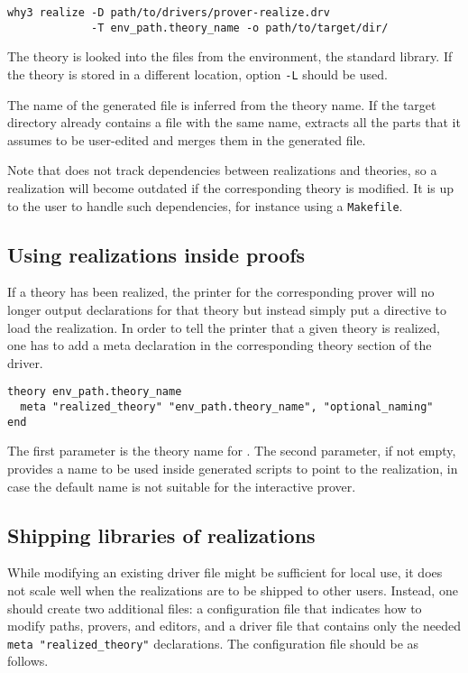 \begin{verbatim}
why3 realize -D path/to/drivers/prover-realize.drv
             -T env_path.theory_name -o path/to/target/dir/
\end{verbatim}

The theory is looked into the files from the environment, \eg the standard
library. If the theory is stored in a different location, option \texttt{-L}
should be used.

The name of the generated file is inferred from the theory name. If the
target directory already contains a file with the same name, \why
extracts all the parts that it assumes to be user-edited and merges them in
the generated file.

Note that \why does not track dependencies between realizations and
theories, so a realization will become outdated if the corresponding
theory is modified.
It is up to the user to handle such dependencies, for instance using a
\texttt{Makefile}.

\subsection{Using realizations inside proofs}

If a theory has been realized, the \why printer for the corresponding prover
will no longer output declarations for that theory but instead simply put
a directive to load the realization. In order to tell the printer
that a given theory is realized, one has to add a meta declaration in the
corresponding theory section of the driver.

\begin{verbatim}
theory env_path.theory_name
  meta "realized_theory" "env_path.theory_name", "optional_naming"
end
\end{verbatim}

The first parameter is the theory name for \why. The second
parameter, if not empty, provides a name to be used inside generated
scripts to point to the realization, in case the default name is not
suitable for the interactive prover.

\subsection{Shipping libraries of realizations}

While modifying an existing driver file might be sufficient for local
use, it does not scale well when the realizations are to be shipped to
other users. Instead, one should create two additional files: a
configuration file that indicates how to modify paths, provers, and
editors, and a driver file that contains only the needed
\verb+meta "realized_theory"+ declarations. The configuration file should be as
follows.

